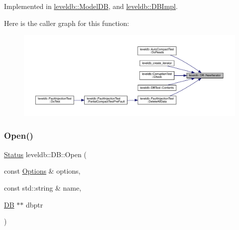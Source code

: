 Implemented in \mbox{\hyperlink{classleveldb_1_1_model_d_b_a5acf23bae313f2e2f3ea9f0ab95450cf}{leveldb\+::\+Model\+DB}}, and \mbox{\hyperlink{classleveldb_1_1_d_b_impl_ae955dc8f2a1c38588723a0882653cb58}{leveldb\+::\+D\+B\+Impl}}.

Here is the caller graph for this function\+:
\nopagebreak
\begin{figure}[H]
\begin{center}
\leavevmode
\includegraphics[width=350pt]{classleveldb_1_1_d_b_a5629308235de24c05c286c353d4e7d32_icgraph}
\end{center}
\end{figure}
\mbox{\label{classleveldb_1_1_d_b_ac1da2b48e911287d86f3a3bfa0f851fe}} 
\subsubsection{\texorpdfstring{Open()}{Open()}}
{\footnotesize\ttfamily \mbox{\hyperlink{classleveldb_1_1_status}{Status}} leveldb\+::\+D\+B\+::\+Open (\begin{DoxyParamCaption}\item[{const \mbox{\hyperlink{structleveldb_1_1_options}{Options}} \&}]{options,  }\item[{const std\+::string \&}]{name,  }\item[{\mbox{\hyperlink{classleveldb_1_1_d_b}{DB}} $\ast$$\ast$}]{dbptr }\end{DoxyParamCaption})\hspace{0.3cm}{\ttfamily [static]}}


